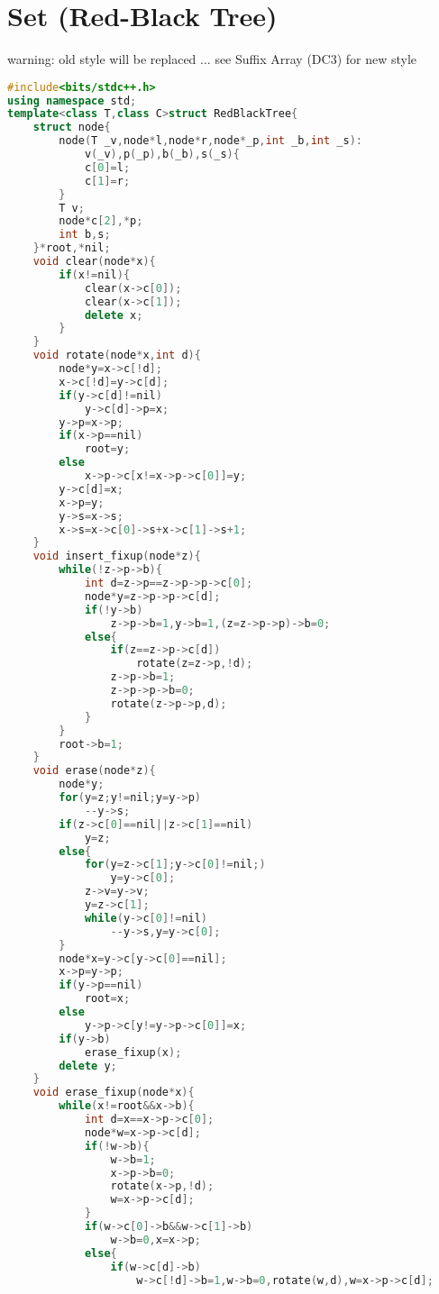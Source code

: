 \documentclass{book}
\begin{document}
\section{Set (Red-Black Tree)}
warning: old style will be replaced ... see Suffix Array (DC3) for new style\begin{lstlisting}[language=C++,title={Set (Red-Black Tree).hpp (7432 bytes, 307 lines)}]
#include<bits/stdc++.h>
using namespace std;
template<class T,class C>struct RedBlackTree{
    struct node{
        node(T _v,node*l,node*r,node*_p,int _b,int _s):
            v(_v),p(_p),b(_b),s(_s){
            c[0]=l;
            c[1]=r;
        }
        T v;
        node*c[2],*p;
        int b,s;
    }*root,*nil;
    void clear(node*x){
        if(x!=nil){
            clear(x->c[0]);
            clear(x->c[1]);
            delete x;
        }
    }
    void rotate(node*x,int d){
        node*y=x->c[!d];
        x->c[!d]=y->c[d];
        if(y->c[d]!=nil)
            y->c[d]->p=x;
        y->p=x->p;
        if(x->p==nil)
            root=y;
        else
            x->p->c[x!=x->p->c[0]]=y;
        y->c[d]=x;
        x->p=y;
        y->s=x->s;
        x->s=x->c[0]->s+x->c[1]->s+1;
    }
    void insert_fixup(node*z){
        while(!z->p->b){
            int d=z->p==z->p->p->c[0];
            node*y=z->p->p->c[d];
            if(!y->b)
                z->p->b=1,y->b=1,(z=z->p->p)->b=0;
            else{
                if(z==z->p->c[d])
                    rotate(z=z->p,!d);
                z->p->b=1;
                z->p->p->b=0;
                rotate(z->p->p,d);
            }
        }
        root->b=1;
    }
    void erase(node*z){
        node*y;
        for(y=z;y!=nil;y=y->p)
            --y->s;
        if(z->c[0]==nil||z->c[1]==nil)
            y=z;
        else{
            for(y=z->c[1];y->c[0]!=nil;)
                y=y->c[0];
            z->v=y->v;
            y=z->c[1];
            while(y->c[0]!=nil)
                --y->s,y=y->c[0];
        }
        node*x=y->c[y->c[0]==nil];
        x->p=y->p;
        if(y->p==nil)
            root=x;
        else
            y->p->c[y!=y->p->c[0]]=x;
        if(y->b)
            erase_fixup(x);
        delete y;
    }
    void erase_fixup(node*x){
        while(x!=root&&x->b){
            int d=x==x->p->c[0];
            node*w=x->p->c[d];
            if(!w->b){
                w->b=1;
                x->p->b=0;
                rotate(x->p,!d);
                w=x->p->c[d];
            }
            if(w->c[0]->b&&w->c[1]->b)
                w->b=0,x=x->p;
            else{
                if(w->c[d]->b)
                    w->c[!d]->b=1,w->b=0,rotate(w,d),w=x->p->c[d];

\end{lstlisting}
\end{document}
